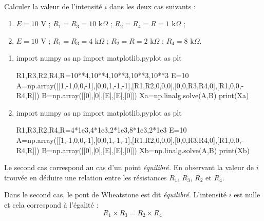 \setcounter{numques}{0}~\\

\question{} Calculer la valeur de l'intensité $i$ dans les deux cas suivants :
		\begin{enumerate}
			\item $E = 10$ V ; $R_1 = R_3 = 10 \text{ k} \Omega$ ; $R_2 = R_4 = R = 1 \text{ k} \Omega$ ;
			\item $E = 10$ V ; $R_1 = R_3 = 4 \text{ k} \Omega$ ; $R_2 = R = 2 \text{ k} \Omega$ ; $R_4= 8 \text{ k} \Omega$.
		\end{enumerate}

		\begin{enumerate}
			\item
\begin{xxpyconsole}%
\begin{pyconsole}
import numpy as np
import matplotlib.pyplot as plt


R1,R3,R2,R4,R=10**4,10**4,10**3,10**3,10**3
E=10
A=np.array([[1,-1,0,0,-1],[0,0,1,-1,-1],[R1,R2,0,0,0],[0,0,R3,R4,0],[R1,0,0,-R4,R]])
B=np.array([[0],[0],[E],[E],[0]])
Xa=np.linalg.solve(A,B)
print(Xa)
\end{pyconsole}
\end{xxpyconsole}
			\item
\begin{xxpyconsole}%
\begin{pyconsole}
import numpy as np
import matplotlib.pyplot as plt


R1,R3,R2,R4,R=4*1e3,4*1e3,2*1e3,8*1e3,2*1e3
E=10
A=np.array([[1,-1,0,0,-1],[0,0,1,-1,-1],[R1,R2,0,0,0],[0,0,R3,R4,0],[R1,0,0,-R4,R]])
B=np.array([[0],[0],[E],[E],[0]])
Xb=np.linalg.solve(A,B)
print(Xb)
\end{pyconsole}
\end{xxpyconsole}
\end{enumerate}

\question{} Le second cas correspond au cas d'un point \textit{équilibré.} En observant la valeur de $i$ trouvée en déduire une relation entre les résistances $R_1$, $R_3$, $R_2$ et $R_4$.



Dans le second cas, le pont de Wheatstone est dit \textit{équilibré}. L'intensité $i$ est nulle et cela correspond à l'égalité :
\[ R_1\times R_3=R_2\times R_4. \]


